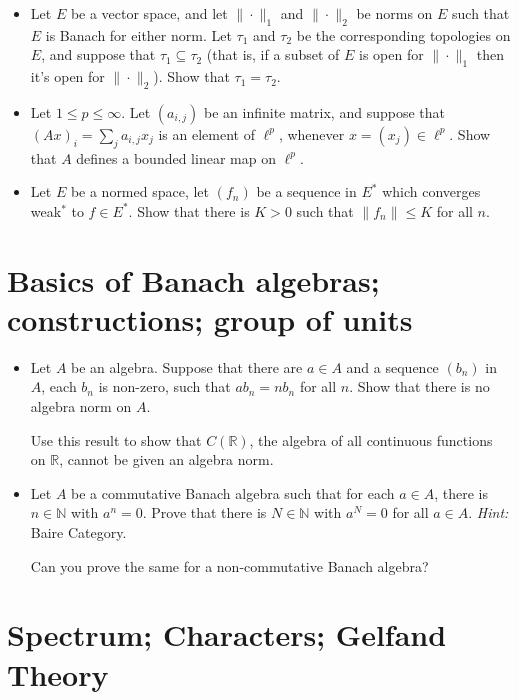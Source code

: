\documentclass[twoside,12pt,a4paper]{article}
\begin{document}
\begin{itemize}
\item Let $E$ be a vector space, and let $\|\cdot\|_1$ and $\|\cdot\|_2$
be norms on $E$ such that $E$ is Banach for either norm.  Let $\tau_1$
and $\tau_2$ be the corresponding topologies on $E$, and suppose that
$\tau_1 \subseteq \tau_2$ (that is, if a subset of $E$ is open for
$\|\cdot\|_1$ then it's open for $\|\cdot\|_2$).  Show that $\tau_1=\tau_2$.
\item Let $1\leq p\leq\infty$.  Let $(a_{i,j})$ be an infinite matrix,
and suppose that $(Ax)_i = \sum_j a_{i,j} x_j$ is an element of $\ell^p$,
whenever $x=(x_j)\in\ell^p$.  Show that $A$ defines a bounded linear map
on $\ell^p$.
\item Let $E$ be a normed space, let $(f_n)$ be a sequence in $E^*$ which
converges weak$^*$ to $f\in E^*$.  Show that there is $K>0$ such that
$\|f_n\|\leq K$ for all $n$.
\end{itemize}


\section{Basics of Banach algebras; constructions; group of units}

\begin{itemize}
\item Let $A$ be an algebra.  Suppose that there are $a\in A$ and
a sequence $(b_n)$ in $A$, each $b_n$ is non-zero, such that
$ab_n = nb_n$ for all $n$.  Show that there is no algebra norm on $A$.

Use this result to show that $C(\mathbb R)$, the algebra of all continuous
functions on $\mathbb R$, cannot be given an algebra norm.

\item Let $A$ be a commutative Banach algebra such that for each $a\in A$,
there is $n\in\mathbb N$ with $a^n=0$.  Prove that there is $N\in\mathbb N$
with $a^N=0$ for all $a\in A$.  \emph{Hint:} Baire Category.

Can you prove the same for a non-commutative Banach algebra?
\end{itemize}


\section{Spectrum; Characters; Gelfand Theory}
\end{document}
